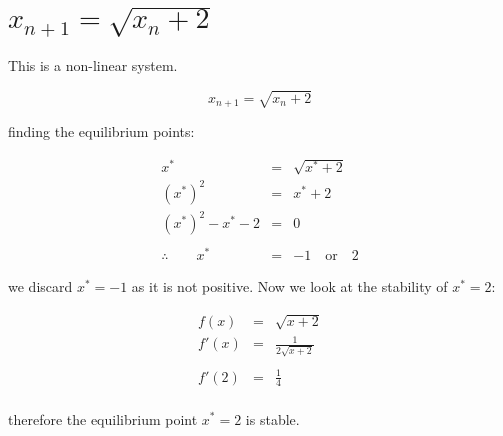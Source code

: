 \documentclass{report}
\begin{document}
\section{$x_{n + 1} = \sqrt{x_n + 2}$}

This is a non-linear system. \bigskip

\[
    x_{n + 1} = \sqrt{x_n + 2}
\]\medskip

finding the equilibrium points: \bigskip

\begin{eqnarray*}
                      x^* & = & \sqrt{x^* + 2} \\
                  (x^*)^2 & = & x^* + 2 \\
        (x^*)^2 - x^* - 2 & = & 0 \\\\
    \therefore \qquad x^* & = & -1 \quad \text{or} \quad 2
\end{eqnarray*}\medskip

we discard $x^* = -1$ as it is not positive. Now we look at the
stability of $x^* = 2$: \bigskip

\begin{eqnarray*}
     f(x) & = & \sqrt{x + 2} \\
    f'(x) & = & \frac{1}{2 \sqrt{x + 2}} \\\\
    f'(2) & = & \frac{1}{4} \\
\end{eqnarray*}\medskip

therefore the equilibrium point $x^* = 2$ is stable. \bigskip






\newpage










\end{document}
